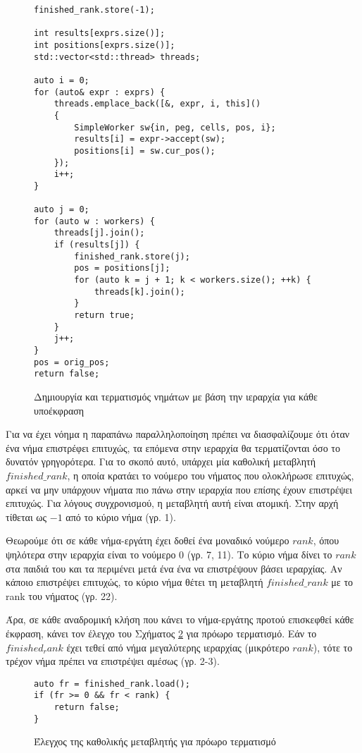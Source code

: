 \begin{figure}[h]
\setlength\partopsep{-\topsep}%
\begin{verbatim}
finished_rank.store(-1);

int results[exprs.size()];
int positions[exprs.size()];
std::vector<std::thread> threads;

auto i = 0;
for (auto& expr : exprs) { 
    threads.emplace_back([&, expr, i, this]()
    {
        SimpleWorker sw{in, peg, cells, pos, i};
        results[i] = expr->accept(sw);
        positions[i] = sw.cur_pos();
    });
    i++;
}

auto j = 0;
for (auto w : workers) {
    threads[j].join(); 
    if (results[j]) { 
        finished_rank.store(j);
        pos = positions[j];
        for (auto k = j + 1; k < workers.size(); ++k) {
            threads[k].join();
        }
        return true;
    }
    j++;
}
pos = orig_pos;
return false;
\end{verbatim}
\caption{Δημιουργία και τερματισμός νημάτων με βάση την ιεραρχία για κάθε υποέκφραση}
\label{fig:top_down_1}
\end{figure}

Για να έχει νόημα η παραπάνω παραλληλοποίηση πρέπει να διασφαλίζουμε ότι όταν ένα νήμα επιστρέφει επιτυχώς, τα επόμενα στην ιεραρχία θα τερματίζονται όσο το δυνατόν γρηγορότερα.
Για το σκοπό αυτό, υπάρχει μία καθολική μεταβλητή $finished\_rank$, η οποία κρατάει το νούμερο του νήματος που ολοκλήρωσε επιτυχώς, αρκεί να μην υπάρχουν νήματα πιο πάνω στην ιεραρχία που επίσης έχουν επιστρέψει επιτυχώς.
Για λόγους συγχρονισμού, η μεταβλητή αυτή είναι ατομική.
Στην αρχή τίθεται ως $-1$ από το κύριο νήμα (γρ. 1).

Θεωρούμε ότι σε κάθε νήμα-εργάτη έχει δοθεί ένα μοναδικό νούμερο $rank$, όπου ψηλότερα στην ιεραρχία είναι το νούμερο $0$ (γρ. 7, 11).
Το κύριο νήμα δίνει το $rank$ στα παιδιά του και τα περιμένει μετά ένα ένα να επιστρέψουν βάσει ιεραρχίας.
Αν κάποιο επιστρέψει επιτυχώς, το κύριο νήμα θέτει τη μεταβλητή $finished\_rank$ με το rank του νήματος (γρ. 22).

Άρα, σε κάθε αναδρομική κλήση που κάνει το νήμα-εργάτης προτού επισκεφθεί κάθε έκφραση, κάνει τον έλεγχο του Σχήματος \ref{fig:top_down_2} για πρόωρο τερματισμό.
Εάν το $finished_rank$ έχει τεθεί από νήμα μεγαλύτερης ιεραρχίας (μικρότερο $rank$), τότε το τρέχον νήμα πρέπει να επιστρέψει αμέσως (γρ. 2-3).

\begin{figure}[h]
\setlength\partopsep{-\topsep}%
\begin{verbatim}
auto fr = finished_rank.load();
if (fr >= 0 && fr < rank) { 
    return false;
}
\end{verbatim}
\caption{Έλεγχος της καθολικής μεταβλητής για πρόωρο τερματισμό}
\label{fig:top_down_2}
\end{figure}

